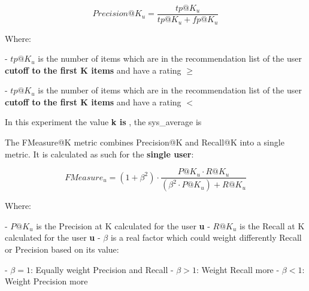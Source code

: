 \documentclass[12pt, a4paper]{article}
\begin{document}
    \[
    Precision@K_u = \frac{tp@K_u}{tp@K_u + fp@K_u}
    \]

    Where:

    - $tp@K_u$ is the number of items which are in the recommendation list  of the user
      \textbf{cutoff to the first K items} and have a rating $\geq$
        \textbf{}
        \textbf{}


    - $tp@K_u$ is the number of items which are in the recommendation list  of the user
      \textbf{cutoff to the first K items} and have a rating $<$
        \textbf{}
        \textbf{}



In this experiment the value \textbf{k is },
the sys\_average is \textbf{}



\hfill\break\hfill\break
 The FMeasure@K metric combines Precision@K and Recall@K into a single metric.
 It is calculated as such for the
    \textbf{single user}:

    \[
    FMeasure_u = (1 + \beta^2) \cdot \frac{P@K_u \cdot R@K_u}{(\beta^2 \cdot P@K_u) + R@K_u}
    \]

    Where:

    - $P@K_u$ is the Precision at K calculated for the user \textbf{u}
    - $R@K_u$ is the Recall at K calculated for the user \textbf{u}
    - $\beta$ is a real factor which could weight differently Recall or Precision based on its value:

        - $\beta = 1$: Equally weight Precision and Recall
        - $\beta > 1$: Weight Recall more
        - $\beta < 1$: Weight Precision more
\end{document}
